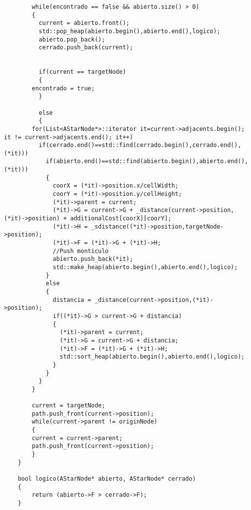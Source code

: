 \begin{lstlisting}
	    while(encontrado == false && abierto.size() > 0)
	    {
	      current = abierto.front();
	      std::pop_heap(abierto.begin(),abierto.end(),logico);
	      abierto.pop_back();
	      cerrado.push_back(current);
	      
	      
	      if(current == targetNode)
	      {
		encontrado = true;
	      }
		
	      else
	      {
		for(List<AStarNode*>::iterator it=current->adjacents.begin(); it != current->adjacents.end(); it++)
		  if(cerrado.end()==std::find(cerrado.begin(),cerrado.end(),(*it)))
		    if(abierto.end()==std::find(abierto.begin(),abierto.end(),(*it)))
		    {
		      coorX = (*it)->position.x/cellWidth;
		      coorY = (*it)->position.y/cellHeight;
		      (*it)->parent = current;
		      (*it)->G = current->G + _distance(current->position,(*it)->position) + additionalCost[coorX][coorY];
		      (*it)->H = _sdistance((*it)->position,targetNode->position);
		      (*it)->F = (*it)->G + (*it)->H;
		      //Push monticulo
		      abierto.push_back(*it);
		      std::make_heap(abierto.begin(),abierto.end(),logico);
		    }
		    else
		    {
		      distancia = _distance(current->position,(*it)->position);
		      if((*it)->G > current->G + distancia)
		      {
		        (*it)->parent = current;
		        (*it)->G = current->G + distancia;
		        (*it)->F = (*it)->G + (*it)->H;
		        std::sort_heap(abierto.begin(),abierto.end(),logico);
		      }
		    }
	      }
	    }
	    
	    current = targetNode;
	    path.push_front(current->position);
	    while(current->parent != originNode)
	    {
		current = current->parent;
		path.push_front(current->position);
	    }
	}

	bool logico(AStarNode* abierto, AStarNode* cerrado)
	{
	    return (abierto->F > cerrado->F);
	}

\end{lstlisting}
